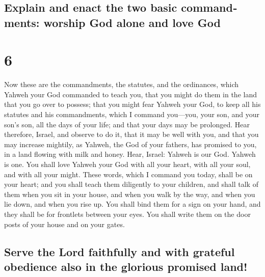 \begin{paracol}{2}
\begin{otherlanguage}{english}
\hypertarget{explain-and-enact-the-two-basic-commandments-worship-god-alone-and-love-god}{%
\subsection{Explain and enact the two basic commandments: worship God
alone and love
God}\label{explain-and-enact-the-two-basic-commandments-worship-god-alone-and-love-god}}

\hypertarget{section-11}{%
\section{6}\label{section-11}}

 Now these are the commandments, the statutes, and the
ordinances, which Yahweh your God commanded to teach you, that you might
do them in the land that you go over to possess;  that you
might fear Yahweh your God, to keep all his statutes and his
commandments, which I command you---you, your son, and your son's son,
all the days of your life; and that your days may be prolonged.
 Hear therefore, Israel, and observe to do it, that it may
be well with you, and that you may increase mightily, as Yahweh, the God
of your fathers, has promised to you, in a land flowing with milk and
honey.  Hear, Israel: Yahweh is our God. Yahweh is one.
 You shall love Yahweh your God with all your heart, with
all your soul, and with all your might.  These words,
which I command you today, shall be on your heart;  and
you shall teach them diligently to your children, and shall talk of them
when you sit in your house, and when you walk by the way, and when you
lie down, and when you rise up.  You shall bind them for a
sign on your hand, and they shall be for frontlets between your eyes.
 You shall write them on the door posts of your house and
on your gates.

\hypertarget{serve-the-lord-faithfully-and-with-grateful-obedience-also-in-the-glorious-promised-land}{%
\subsection{Serve the Lord faithfully and with grateful obedience also
in the glorious promised
land!}\label{serve-the-lord-faithfully-and-with-grateful-obedience-also-in-the-glorious-promised-land}}


\end{otherlanguage}
\end{paracol}
